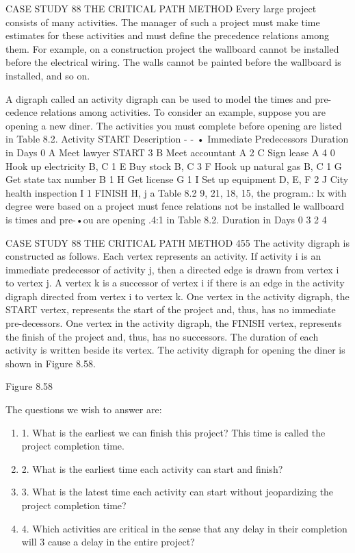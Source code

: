 CASE STUDY 88 THE CRITICAL PATH METHOD
Every large project consists of many activities. 
The manager of such a project must make time estimates for these activities and must define the precedence relations among them.
For example, on a construction project the wallboard cannot be installed before the electrical wiring. The walls cannot be painted before the wallboard is installed, and so on. 

A digraph called an activity digraph can be used to model the times and pre-cedence relations among activities. To consider an example, suppose you are opening a new diner. 
The activities you must complete before opening are listed in Table 8.2. 
Activity START Description - - • Immediate Predecessors Duration in Days 0 A Meet lawyer START 3 B Meet accountant A 2 C Sign lease A 4 0 Hook up electricity B, C 1 E Buy stock B, C 3 F Hook up natural gas B, C 1 G Get state tax number B 1 H Get license G 1 I Set up equipment D, E, F 2 J City health inspection I 1 FINISH H, j a 
Table 8.2 
9, 21, 18, 15, the program.: lx with degree were based on 
a project must fence relations not be installed le wallboard is times and pre-•ou are opening .4:1 in Table 8.2. 
Duration in Days 
0 3 2 4 

CASE STUDY 88 THE CRITICAL PATH METHOD 455 
The activity digraph is constructed as follows. Each vertex represents an activity. If activity i is an immediate predecessor of activity j, then a directed edge is drawn from vertex i to vertex j. A vertex k is a successor of vertex i if there is an edge in the activity digraph directed from vertex i to vertex k. One vertex in the activity digraph, the START vertex, represents the start of the project and, thus, has no immediate pre-decessors. One vertex in the activity digraph, the FINISH vertex, represents the finish of the project and, thus, has no successors. The duration of each activity is written beside its vertex. The activity digraph for opening the diner is shown in Figure 8.58. 

Figure 8.58 

The questions we wish to answer are: 
\begin{enumerate}
\item 1. What is the earliest we can finish this project? This time is called the project completion time. 
\item 2. What is the earliest time each activity can start and finish? 
\item 3. What is the latest time each activity can start without jeopardizing the project completion time? 
\item 4. Which activities are critical in the sense that any delay in their completion will 3 cause a delay in the entire project? 
\end{enumerate}

